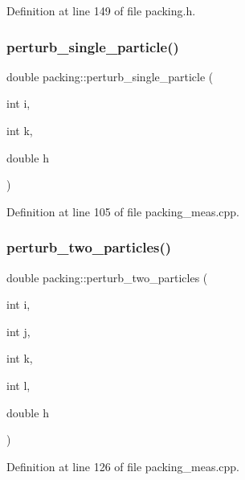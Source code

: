 Definition at line 149 of file packing.\+h.

\mbox{\label{classpacking_a9e94b699c2cc7d52a74cd2e4a8642371}} 
\subsubsection{\texorpdfstring{perturb\+\_\+single\+\_\+particle()}{perturb\_single\_particle()}}
{\footnotesize\ttfamily double packing\+::perturb\+\_\+single\+\_\+particle (\begin{DoxyParamCaption}\item[{int}]{i,  }\item[{int}]{k,  }\item[{double}]{h }\end{DoxyParamCaption})}



Definition at line 105 of file packing\+\_\+meas.\+cpp.

\mbox{\label{classpacking_aa9d162db11496df9f1dd4696fe1924da}} 
\subsubsection{\texorpdfstring{perturb\+\_\+two\+\_\+particles()}{perturb\_two\_particles()}}
{\footnotesize\ttfamily double packing\+::perturb\+\_\+two\+\_\+particles (\begin{DoxyParamCaption}\item[{int}]{i,  }\item[{int}]{j,  }\item[{int}]{k,  }\item[{int}]{l,  }\item[{double}]{h }\end{DoxyParamCaption})}



Definition at line 126 of file packing\+\_\+meas.\+cpp.

\mbox{\label{classpacking_a0674ff540e56b7de2919fea2960b7703}} 
